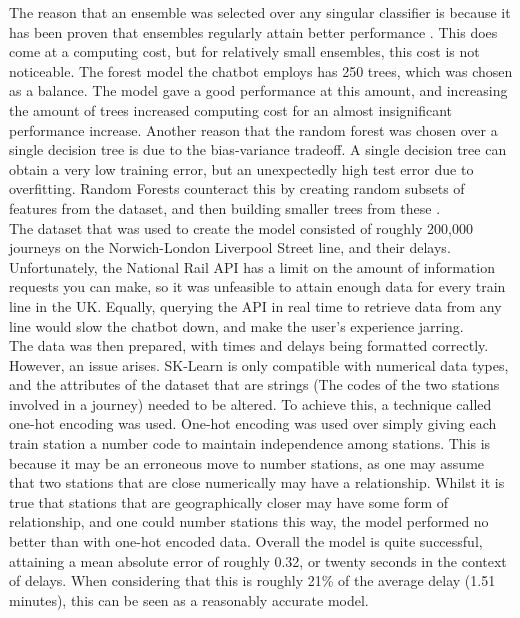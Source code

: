 \documentclass[12pt,a4paper]{article}
\begin{document}
    The reason that an ensemble was selected over any singular classifier is because it has been proven that ensembles regularly attain better performance \citep{Dietterich2000}. This does come at a computing cost, but for relatively small ensembles, this cost is not noticeable. The forest model the chatbot employs has 250 trees, which was chosen as a balance. The model gave a good performance at this amount, and increasing the amount of trees increased computing cost for an almost insignificant performance increase. Another reason that the random forest was chosen over a single decision tree is due to the bias-variance tradeoff. A single decision tree can obtain a very low training error, but an unexpectedly high test error due to overfitting. Random Forests counteract this by creating random subsets of features from the dataset, and then building smaller trees from these \citep{Breiman2001}. \\
    
    The dataset that was used to create the model consisted of roughly 200,000 journeys on the Norwich-London Liverpool Street line, and their delays. Unfortunately, the National Rail API has a limit on the amount of information requests you can make, so it was unfeasible to attain enough data for every train line in the UK. Equally, querying the API in real time to retrieve data from any line would slow the chatbot down, and make the user's experience jarring. \\
    
    The data was then prepared, with times and delays being formatted correctly. However, an issue arises. SK-Learn is only compatible with numerical data types, and the attributes of the dataset that are strings (The codes of the two stations involved in a journey) needed to be altered. To achieve this, a technique called one-hot encoding was used. One-hot encoding was used over simply giving each train station a number code to maintain independence among stations. This is because it may be an erroneous move to number stations, as one may assume that two stations that are close numerically may have a relationship. Whilst it is true that stations that are geographically closer may have some form of relationship, and one could number stations this way, the model performed no better than with one-hot encoded data. Overall the model is quite successful, attaining a mean absolute error of roughly 0.32, or twenty seconds in the context of delays. When considering that this is roughly 21\% of the average delay (1.51 minutes), this can be seen as a reasonably accurate model.  
    
\end{document}
